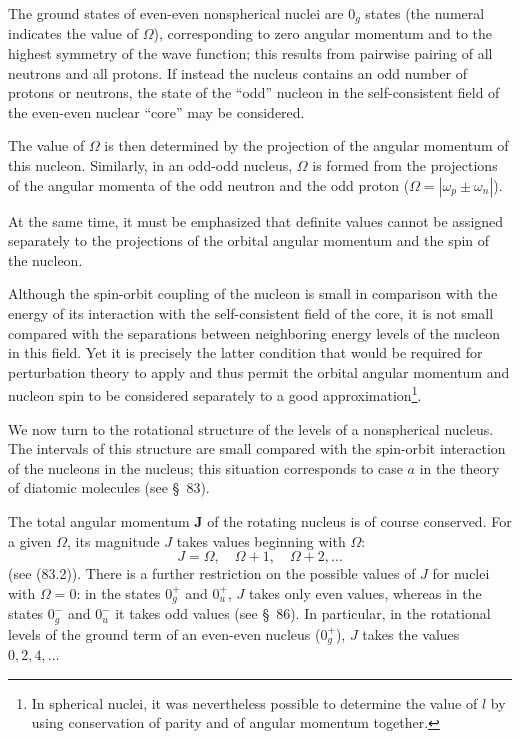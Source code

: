 The ground states of even-even nonspherical nuclei are $0_g$ states (the numeral indicates the value of $\Omega$), corresponding to zero angular momentum and to the highest symmetry of the wave function; this results from pairwise pairing of all neutrons and all protons. If instead the nucleus contains an odd number of protons or neutrons, the state of the ``odd'' nucleon in the self-consistent field of the even-even nuclear ``core'' may be considered.

The value of $\Omega$ is then determined by the projection of the angular momentum of this nucleon. Similarly, in an odd-odd nucleus, $\Omega$ is formed from the projections of the angular momenta of the odd neutron and the odd proton ($\Omega=|\omega_p\pm\omega_n|$).

At the same time, it must be emphasized that definite values cannot be assigned separately to the projections of the orbital angular momentum and the spin of the nucleon.

Although the spin-orbit coupling of the nucleon is small in comparison with the energy of its interaction with the self-consistent field of the core, it is not small compared with the separations between neighboring energy levels of the nucleon in this field. Yet it is precisely the latter condition that would be required for perturbation theory to apply and thus permit the orbital angular momentum and nucleon spin to be considered separately to a good approximation\footnote{In spherical nuclei, it was nevertheless possible to determine the value of $l$ by using conservation of parity and of angular momentum together.}.

We now turn to the rotational structure of the levels of a nonspherical nucleus. The intervals of this structure are small compared with the spin-orbit interaction of the nucleons in the nucleus; this situation corresponds to case $a$ in the theory of diatomic molecules (see \S~83).

The total angular momentum $\mathbf J$ of the rotating nucleus is of course conserved. For a given $\Omega$, its magnitude $J$ takes values beginning with $\Omega$:
\begin{equation}
 J=\Omega,\quad \Omega+1,\quad \Omega+2,\ldots
 \tag{119.1}
\end{equation}
(see (83.2)). There is a further restriction on the possible values of $J$ for nuclei with $\Omega=0$: in the states $0_g^+$ and $0_u^+$, $J$ takes only even values, whereas in the states $0_g^-$ and $0_u^-$ it takes odd values (see \S~86). In particular, in the rotational levels of the ground term of an even-even nucleus ($0_g^+$), $J$ takes the values $0,2,4,\ldots$

